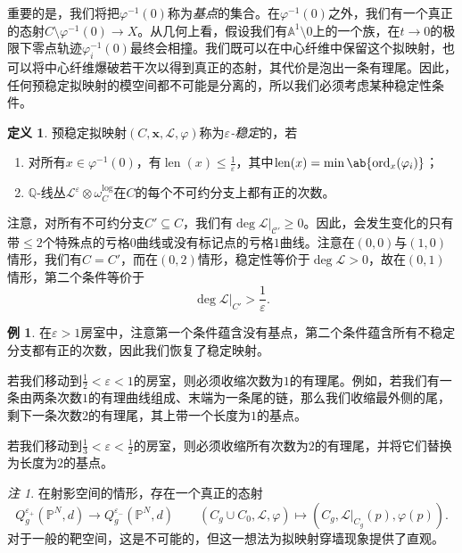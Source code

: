 \documentclass{amsart}
\theoremstyle{definition}
\newtheorem{defn}[thm]{定义}
\newtheorem{exm}[thm]{例}
\theoremstyle{remark}
\newtheorem{rmk}[thm]{注}
\theoremstyle{plain}
\theoremstyle{definition}
\theoremstyle{remark}
\newcommand{\A}{\mathbb{A}}
\newcommand{\Q}{\mathbb{Q}}
\renewcommand{\P}{\mathbb{P}}
\newcommand{\ep}{\varepsilon}
\newcommand{\mc}[1]{\mathcal{#1}}
\newcommand{\on}[1]{\operatorname{#1}}
\newcommand{\1}{\mathbf{1}}
\newcommand{\2}{\mathbf{2}}
\newcommand{\3}{\mathbf{3}}
\begin{document}
重要的是，我们将把\(\varphi^{-1}(0)\)称为\textit{基点}的集合。在\(\varphi^{-1}(0)\)之外，我们有一个真正的态射\(C \setminus \varphi^{-1}(0) \to X\)。从几何上看，假设我们有\(\A^1 \setminus 0\)上的一个族，在\(t \to 0\)的极限下零点轨迹\(\varphi_i^{-1}(0)\)最终会相撞。我们既可以在中心纤维中保留这个拟映射，也可以将中心纤维爆破若干次以得到真正的态射，其代价是泡出一条有理尾。因此，任何预稳定拟映射的模空间都不可能是分离的，所以我们必须考虑某种稳定性条件。

\begin{defn}
    预稳定拟映射\((C, \mathbf{x}, \mc{L}, \varphi)\)称为\textit{\(\ep\)-稳定}的，若
    \begin{enumerate}
        \item 对所有\(x \in \varphi^{-1}(0)\)，有\(\on{len}(x) \leq \frac{1}{\ep}\)，其中\(\on{len}(x) = \min \ab\{ \on{ord}_x (\varphi_i)\}\)；
        \item \(\Q\)-线丛\(\mc{L}^{\ep} \otimes \omega_C^{\log}\)在\(C\)的每个不可约分支上都有正的次数。
    \end{enumerate}
\end{defn}

注意，对所有不可约分支\(C' \subseteq C\)，我们有\(\deg \mc{L}|_{\mc{C}'} \geq 0\)。因此，会发生变化的只有带\(\leq 2\)个特殊点的亏格\(0\)曲线或没有标记点的亏格\(1\)曲线。注意在\((0,0)\)与\((1,0)\)情形，我们有\(C = C'\)，而在\((0,2)\)情形，稳定性等价于\(\deg \mc{L} > 0\)，故在\((0,1)\)情形，第二个条件等价于
\[ \deg \mc{L}|_{C'} > \frac{1}{\ep}. \]

\begin{exm}
    在\(\ep > 1\)房室中，注意第一个条件蕴含没有基点，第二个条件蕴含所有不稳定分支都有正的次数，因此我们恢复了稳定映射。

    若我们移动到\(\frac{1}{2} < \ep < 1\)的房室，则必须收缩次数为\(1\)的有理尾。例如，若我们有一条由两条次数\(1\)的有理曲线组成、末端为一条尾的链，那么我们收缩最外侧的尾，剩下一条次数\(2\)的有理尾，其上带一个长度为\(1\)的基点。

    若我们移动到\(\frac{1}{3} < \ep < \frac{1}{2}\)的房室，则必须收缩所有次数为\(2\)的有理尾，并将它们替换为长度为\(2\)的基点。
\end{exm}

\begin{rmk}
    在射影空间的情形，存在一个真正的态射
    \[ Q_g^{\ep_+}(\P^N, d) \to Q_g^{\ep_-}(\P^N, d) \qquad (C_g \cup C_0, \mc{L}, \varphi) \mapsto (C_g, \mc{L}|_{C_g}(p), \varphi(p)). \]
    对于一般的靶空间，这是不可能的，但这一想法为拟映射穿墙现象提供了直观。
\end{rmk}
\end{document}
